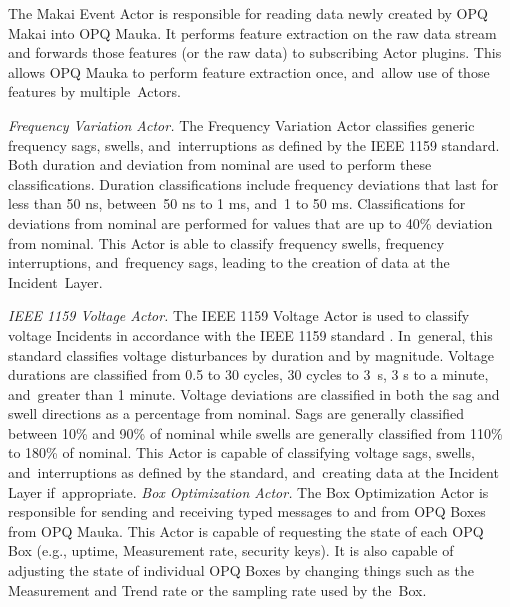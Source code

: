 \documentclass[energies,article,accept,moreauthors,pdftex]{Definitions/mdpi}
\begin{document}
 The Makai Event Actor is responsible for reading data newly created by OPQ Makai into OPQ Mauka. It performs feature extraction on the raw data stream and forwards those features (or the raw data) to subscribing Actor plugins. This allows OPQ Mauka to perform feature extraction once, and~allow use of those features by multiple~Actors.

{\em Frequency Variation Actor.} The Frequency Variation Actor classifies generic frequency sags, swells, and~interruptions as defined by the IEEE 1159 standard. Both duration and deviation from nominal are used to perform these classifications. Duration classifications include frequency deviations that last for less than 50 ns, between~50 ns to 1 ms, and~1 to 50 ms. Classifications for deviations from nominal are performed for values that are up to 40\% deviation from nominal. This Actor is able to classify frequency swells, frequency interruptions, and~frequency sags, leading to the creation of data at the Incident~Layer.

{\em IEEE 1159 Voltage Actor.} The IEEE 1159 Voltage Actor is used to classify voltage Incidents in accordance with the IEEE 1159 standard . In~general, this standard classifies voltage disturbances by duration and by magnitude. Voltage durations are classified from 0.5 to 30 cycles, 30 cycles to 3~s, 3 s to a minute, and~greater than 1 minute. Voltage deviations are classified in both the sag and swell directions as a percentage from nominal. Sags are generally classified between 10\% and 90\% of nominal while swells are generally classified from 110\% to 180\% of nominal. This Actor is capable of classifying voltage sags, swells, and~interruptions as defined by the standard, and~creating data at the Incident Layer if~appropriate.
{\em Box Optimization Actor.} The Box Optimization Actor is responsible for sending and receiving typed messages to and from OPQ Boxes from OPQ Mauka. This Actor is capable of requesting the state of each OPQ Box (e.g., uptime, Measurement rate, security keys). It is also capable of adjusting the state of individual OPQ Boxes by changing things such as the Measurement and Trend rate or the sampling rate used by the~Box.
\end{document}
